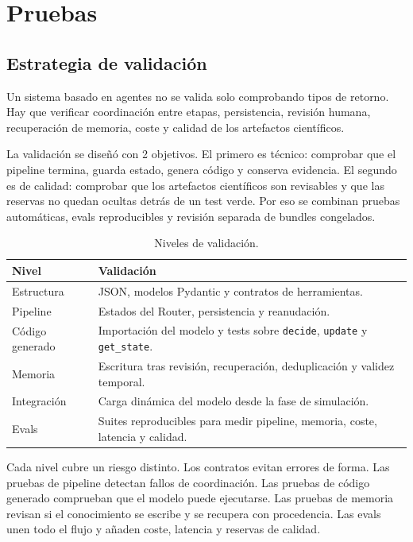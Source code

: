 \chapter{Pruebas}

\section{Estrategia de validación}

Un sistema basado en agentes no se valida solo comprobando tipos de retorno. Hay
que verificar coordinación entre etapas, persistencia, revisión humana,
recuperación de memoria, coste y calidad de los artefactos científicos.

La validación se diseñó con 2 objetivos. El primero es técnico: comprobar que el
pipeline termina, guarda estado, genera código y conserva evidencia. El segundo
es de calidad: comprobar que los artefactos científicos son revisables y que las
reservas no quedan ocultas detrás de un test verde. Por eso se combinan pruebas
automáticas, evals reproducibles y revisión separada de bundles congelados.

\begin{table}[H]
\begin{center}
\small
\begin{tabular}{|p{3cm}|p{9.5cm}|} \hline
\textbf{Nivel} & \textbf{Validación} \\ \hline
Estructura & JSON, modelos Pydantic y contratos de herramientas. \\ \hline
Pipeline & Estados del Router, persistencia y reanudación. \\ \hline
Código generado & Importación del modelo y tests sobre \texttt{decide}, \texttt{update} y \texttt{get\_state}. \\ \hline
Memoria & Escritura tras revisión, recuperación, deduplicación y validez temporal. \\ \hline
Integración & Carga dinámica del modelo desde la fase de simulación. \\ \hline
Evals & Suites reproducibles para medir pipeline, memoria, coste, latencia y calidad. \\ \hline
\end{tabular}
\caption{Niveles de validación.}
\end{center}
\end{table}

Cada nivel cubre un riesgo distinto. Los contratos evitan errores de forma. Las
pruebas de pipeline detectan fallos de coordinación. Las pruebas de código
generado comprueban que el modelo puede ejecutarse. Las pruebas de memoria
revisan si el conocimiento se escribe y se recupera con procedencia. Las evals
unen todo el flujo y añaden coste, latencia y reservas de calidad.

